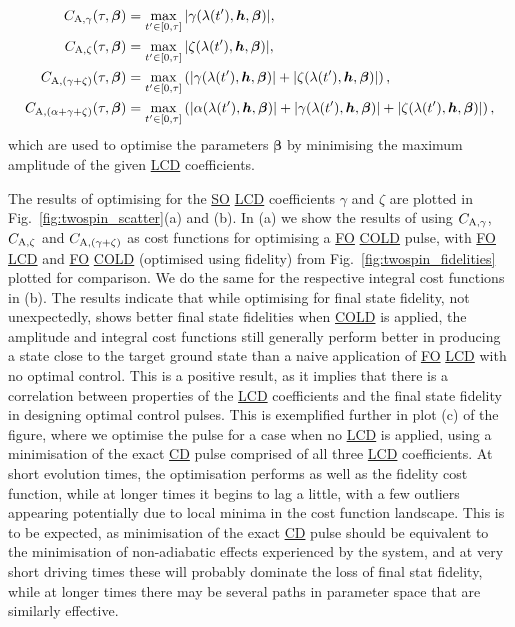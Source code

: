 \documentclass[a4paper,oneside,11pt]{book}
\newcommand{\betabb}{\boldsymbol{\beta}}
\newcommand{\hbb}{\boldsymbol{h}}
\newcommand{\acrref}[1]{\hyperref[acr:#1]{#1}}
\begin{document}
\begin{equation}\label{eq:twospin_costfunc_amp}
    \begin{aligned}
        C_{\rm A, \gamma}(\tau, \betabb) &= \max_{t^{\prime} \in [0,\tau]} | \gamma(\lambda(t^{\prime}), \hbb, \betabb)|,\\
        C_{\rm A, \zeta}(\tau, \betabb) &= \max_{t^{\prime} \in [0,\tau]} | \zeta(\lambda(t^{\prime}), \hbb, \betabb)|,\\
        C_{\rm A, (\gamma + \zeta)}(\tau, \betabb) &= \max_{t^{\prime} \in [0,\tau]} \left(| \gamma(\lambda(t^{\prime}), \hbb, \betabb)| + |\zeta(\lambda(t^{\prime}), \hbb, \betabb)| \right),\\
        C_{\rm A, (\alpha + \gamma + \zeta)}(\tau, \betabb) &= \max_{t^{\prime} \in [0,\tau]} \left(| \alpha(\lambda(t^{\prime}), \hbb, \betabb)| + |\gamma(\lambda(t^{\prime}), \hbb, \betabb)| + |\zeta(\lambda(t^{\prime}), \hbb, \betabb)| \right),
    \end{aligned}
\end{equation}
which are used to optimise the parameters $\betabb$ by minimising the maximum amplitude of the given \acrref{LCD} coefficients.

The results of optimising for the \acrref{SO} \acrref{LCD} coefficients $\gamma$ and $\zeta$ are plotted in Fig.~\ref{fig:twospin_scatter}(a) and (b). In (a) we show the results of using $C_{\rm A, \gamma}$, $C_{\rm A, \zeta}$ and $C_{\rm A, (\gamma + \zeta)}$ as cost functions for optimising a \acrref{FO} \acrref{COLD} pulse, with \acrref{FO} \acrref{LCD} and \acrref{FO} \acrref{COLD} (optimised using fidelity) from Fig.~\ref{fig:twospin_fidelities} plotted for comparison. We do the same for the respective integral cost functions in (b). The results indicate that while optimising for final state fidelity, not unexpectedly, shows better final state fidelities when \acrref{COLD} is applied, the amplitude and integral cost functions still generally perform better in producing a state close to the target ground state than a naive application of \acrref{FO} \acrref{LCD} with no optimal control. This is a positive result, as it implies that there is a correlation between properties of the \acrref{LCD} coefficients and the final state fidelity in designing optimal control pulses. This is exemplified further in plot (c) of the figure, where we optimise the pulse for a case when no \acrref{LCD} is applied, using a minimisation of the exact \acrref{CD} pulse comprised of all three \acrref{LCD} coefficients. At short evolution times, the optimisation performs as well as the fidelity cost function, while at longer times it begins to lag a little, with a few outliers appearing potentially due to local minima in the cost function landscape. This is to be expected, as minimisation of the exact \acrref{CD} pulse should be equivalent to the minimisation of non-adiabatic effects experienced by the system, and at very short driving times these will probably dominate the loss of final stat fidelity, while at longer times there may be several paths in parameter space that are similarly effective. 
\end{document}
